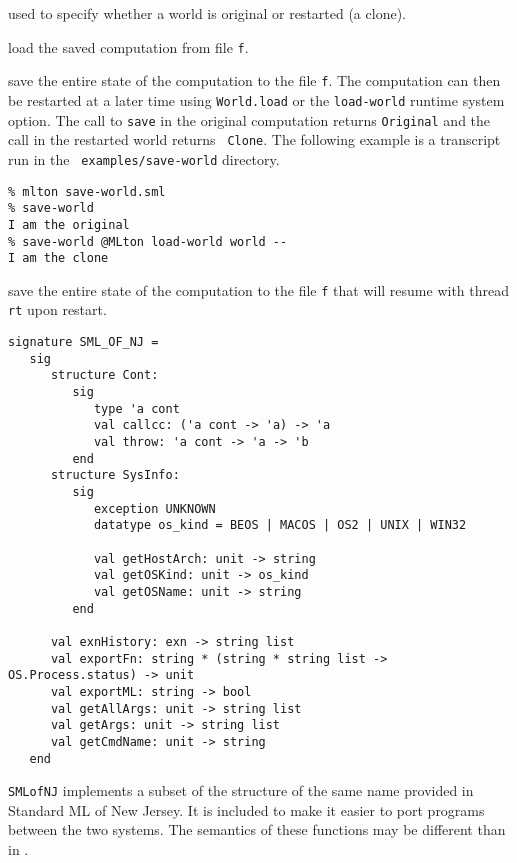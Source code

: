 \begin{description}
used to specify whether a world is original or restarted (a clone).

load the saved computation from file {\tt f}.

save the entire state of the computation to
the file {\tt f}.  The computation can then be restarted at a later
time using {\tt World.load} or the {\tt load-world} runtime system
option.  The call to {\tt save} in the original computation returns
{\tt Original} and the call in the restarted world returns {\tt
Clone}.  The following example is a transcript run in the {\tt
examples/save-world} directory.
\begin{verbatim}
% mlton save-world.sml
% save-world
I am the original
% save-world @MLton load-world world --
I am the clone
\end{verbatim}

save the entire state of the computation to
the file {\tt f} that will resume with thread {\tt rt} upon restart.

\end{description}
%

\begin{verbatim}
signature SML_OF_NJ =
   sig
      structure Cont:
         sig
            type 'a cont
            val callcc: ('a cont -> 'a) -> 'a
            val throw: 'a cont -> 'a -> 'b
         end
      structure SysInfo:
         sig
            exception UNKNOWN
            datatype os_kind = BEOS | MACOS | OS2 | UNIX | WIN32

            val getHostArch: unit -> string
            val getOSKind: unit -> os_kind
            val getOSName: unit -> string
         end

      val exnHistory: exn -> string list
      val exportFn: string * (string * string list -> OS.Process.status) -> unit
      val exportML: string -> bool
      val getAllArgs: unit -> string list
      val getArgs: unit -> string list
      val getCmdName: unit -> string
   end
\end{verbatim}

{\tt SMLofNJ} implements a subset of the structure of the same name
provided in Standard ML of New Jersey.  It is included to make it
easier to port programs between the two systems.  The semantics of
these functions may be different than in {\smlnj}.

